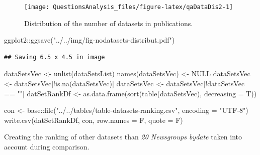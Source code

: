 \documentclass[
]{article}
\newenvironment{Shaded}{\begin{snugshade}}{\end{snugshade}}
\newcommand{\AttributeTok}[1]{\textcolor[rgb]{0.77,0.63,0.00}{#1}}
\newcommand{\ConstantTok}[1]{\textcolor[rgb]{0.00,0.00,0.00}{#1}}
\newcommand{\FunctionTok}[1]{\textcolor[rgb]{0.00,0.00,0.00}{#1}}
\newcommand{\NormalTok}[1]{#1}
\newcommand{\OtherTok}[1]{\textcolor[rgb]{0.56,0.35,0.01}{#1}}
\newcommand{\SpecialCharTok}[1]{\textcolor[rgb]{0.00,0.00,0.00}{#1}}
\newcommand{\StringTok}[1]{\textcolor[rgb]{0.31,0.60,0.02}{#1}}
\begin{document}
\begin{figure}

{\centering \texttt{[image: QuestionsAnalysis\_files/figure-latex/qaDataDis2-1]} 

}

\caption{Distribution of the number of datasets in publications.}\label{fig:qaDataDis2}
\end{figure}

\begin{Shaded}
\begin{Highlighting}[]
\NormalTok{ggplot2}\SpecialCharTok{::}\FunctionTok{ggsave}\NormalTok{(}\StringTok{"../../img/fig{-}nodatasets{-}distribut.pdf"}\NormalTok{)}
\end{Highlighting}
\end{Shaded}

\begin{verbatim}
## Saving 6.5 x 4.5 in image
\end{verbatim}

\begin{Shaded}
\begin{Highlighting}[]
\NormalTok{dataSetsVec }\OtherTok{\textless{}{-}} \FunctionTok{unlist}\NormalTok{(dataSetsList)}
\FunctionTok{names}\NormalTok{(dataSetsVec) }\OtherTok{\textless{}{-}} \ConstantTok{NULL}
\NormalTok{dataSetsVec }\OtherTok{\textless{}{-}}\NormalTok{ dataSetsVec[}\SpecialCharTok{!}\FunctionTok{is.na}\NormalTok{(dataSetsVec)]}
\NormalTok{dataSetsVec }\OtherTok{\textless{}{-}}\NormalTok{ dataSetsVec[}\SpecialCharTok{!}\NormalTok{dataSetsVec }\SpecialCharTok{==} \StringTok{""}\NormalTok{]}
\NormalTok{datSetRankDf }\OtherTok{\textless{}{-}} \FunctionTok{as.data.frame}\NormalTok{(}\FunctionTok{sort}\NormalTok{(}\FunctionTok{table}\NormalTok{(dataSetsVec), }\AttributeTok{decreasing =}\NormalTok{ T))}

\NormalTok{con }\OtherTok{\textless{}{-}}\NormalTok{ base}\SpecialCharTok{::}\FunctionTok{file}\NormalTok{(}\StringTok{"../../tables/table{-}datasets{-}ranking.csv"}\NormalTok{, }\AttributeTok{encoding =} \StringTok{"UTF{-}8"}\NormalTok{)}
\FunctionTok{write.csv}\NormalTok{(datSetRankDf, con, }\AttributeTok{row.names =}\NormalTok{ F, }\AttributeTok{quote =}\NormalTok{ F)}
\end{Highlighting}
\end{Shaded}

Creating the ranking of other datasets than \emph{20 Newsgroups bydate} taken into account during comparison.
\end{document}

